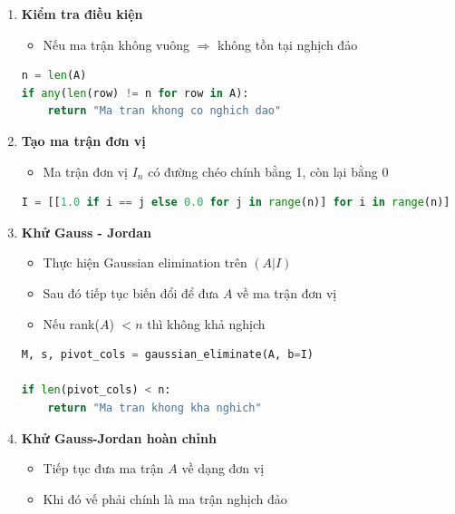 \documentclass[a4paper,12pt]{report}
\begin{document}
\begin{enumerate}

\item \textbf{Kiểm tra điều kiện}

\begin{itemize}
    \item Nếu ma trận không vuông $\Rightarrow$ không tồn tại nghịch đảo
\end{itemize}

\begin{lstlisting}[language=Python, caption={Kiểm tra ma trận vuông}]
n = len(A)
if any(len(row) != n for row in A):
    return "Ma tran khong co nghich dao"
\end{lstlisting}

\item \textbf{Tạo ma trận đơn vị}

\begin{itemize}
    \item Ma trận đơn vị $I_n$ có đường chéo chính bằng 1, còn lại bằng 0
\end{itemize}

\begin{lstlisting}[language=Python, caption={Tạo ma trận đơn vị}]
I = [[1.0 if i == j else 0.0 for j in range(n)] for i in range(n)]
\end{lstlisting}

\item \textbf{Khử Gauss - Jordan}

\begin{itemize}
    \item Thực hiện Gaussian elimination trên $(A|I)$
    \item Sau đó tiếp tục biến đổi để đưa $A$ về ma trận đơn vị
    \item Nếu rank($A$) $< n$ thì không khả nghịch
\end{itemize}

\begin{lstlisting}[language=Python, caption={Khử Gauss trên (A|I)}]
M, s, pivot_cols = gaussian_eliminate(A, b=I)

if len(pivot_cols) < n:
    return "Ma tran khong kha nghich"
\end{lstlisting}

\item \textbf{Khử Gauss-Jordan hoàn chỉnh}

\begin{itemize}
    \item Tiếp tục đưa ma trận $A$ về dạng đơn vị
    \item Khi đó vế phải chính là ma trận nghịch đảo
\end{itemize}


\end{enumerate}
\end{document}
